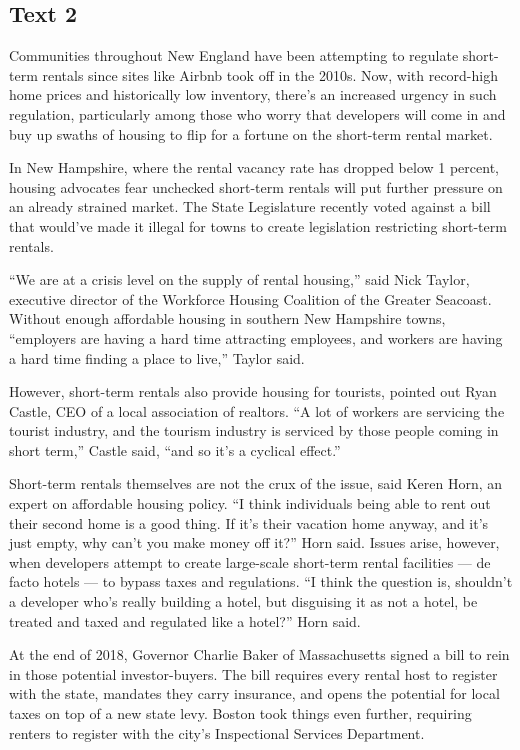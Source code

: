 \newpage
\subsection{Text 2}

Communities throughout New England have been attempting to regulate short-term rentals since sites like Airbnb took off in the 2010s. Now, with record-high home prices and historically low inventory, there's an increased urgency in such regulation, particularly among those who worry that developers will come in and buy up swaths of housing to flip for a fortune on the short-term rental market.

In New Hampshire, where the rental vacancy rate has dropped below 1 percent, housing advocates fear unchecked short-term rentals will put further pressure on an already strained market. The State Legislature recently voted against a bill that would've made it illegal for towns to create legislation restricting short-term rentals.

``We are at a crisis level on the supply of rental housing,'' said Nick Taylor, executive director of the Workforce Housing Coalition of the Greater Seacoast. Without enough affordable housing in southern New Hampshire towns, ``employers are having a hard time attracting employees, and workers are having a hard time finding a place to live,'' Taylor said.

However, short-term rentals also provide housing for tourists, pointed out Ryan Castle, CEO of a local association of realtors. ``A lot of workers are servicing the tourist industry, and the tourism industry is serviced by those people coming in short term,'' Castle said, ``and so it's a cyclical effect.''

Short-term rentals themselves are not the crux of the issue, said Keren Horn, an expert on affordable housing policy. ``I think individuals being able to rent out their second home is a good thing. If it's their vacation home anyway, and it's just empty, why can't you make money off it?'' Horn said. Issues arise, however, when developers attempt to create large-scale short-term rental facilities — de facto hotels — to bypass taxes and regulations. ``I think the question is, shouldn't a developer who's really building a hotel, but disguising it as not a hotel, be treated and taxed and regulated like a hotel?'' Horn said.

At the end of 2018, Governor Charlie Baker of Massachusetts signed a bill to rein in those potential investor-buyers. The bill requires every rental host to register with the state, mandates they carry insurance, and opens the potential for local taxes on top of a new state levy. Boston took things even further, requiring renters to register with the city's Inspectional Services Department.


